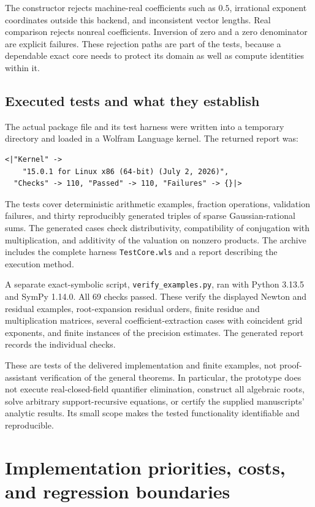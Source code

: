 \documentclass[11pt,letterpaper]{article}
\numberwithin{equation}{section}
\theoremstyle{definition}
\theoremstyle{remark}\newtheorem{remark}[theorem]{Remark}
\begin{document}
The constructor rejects machine-real coefficients such as $0.5$, irrational
exponent coordinates outside this backend, and inconsistent vector lengths.
Real comparison rejects nonreal coefficients. Inversion of zero and a zero
denominator are explicit failures. These rejection paths are part of the
tests, because a dependable exact core needs to protect its domain as well
as compute identities within it.

\subsection{Executed tests and what they establish}
The actual package file and its test harness were written into a temporary
directory and loaded in a Wolfram Language kernel. The returned report was:
\begin{lstlisting}
<|"Kernel" ->
    "15.0.1 for Linux x86 (64-bit) (July 2, 2026)",
  "Checks" -> 110, "Passed" -> 110, "Failures" -> {}|>
\end{lstlisting}
The tests cover deterministic arithmetic examples, fraction operations,
validation failures, and thirty reproducibly generated triples of sparse
Gaussian-rational sums. The generated cases check distributivity,
compatibility of conjugation with multiplication, and additivity of the
valuation on nonzero products. The archive includes the complete harness
\texttt{TestCore.wls} and a report describing the execution method.

A separate exact-symbolic script, \texttt{verify\_examples.py}, ran with
Python 3.13.5 and SymPy 1.14.0. All 69 checks passed. These verify the displayed
Newton and residual examples, root-expansion residual orders, finite residue
and multiplication matrices, several coefficient-extraction cases with
coincident grid exponents, and finite instances of the precision estimates.
The generated report records the individual checks.

These are tests of the delivered implementation and finite examples, not
proof-assistant verification of the general theorems. In particular, the
prototype does not execute real-closed-field quantifier elimination,
construct all algebraic roots, solve arbitrary support-recursive equations,
or certify the supplied manuscripts' analytic results. Its small scope makes
the tested functionality identifiable and reproducible.

\section{Implementation priorities, costs, and regression boundaries}
\label{sec:roadmap}
\end{document}

